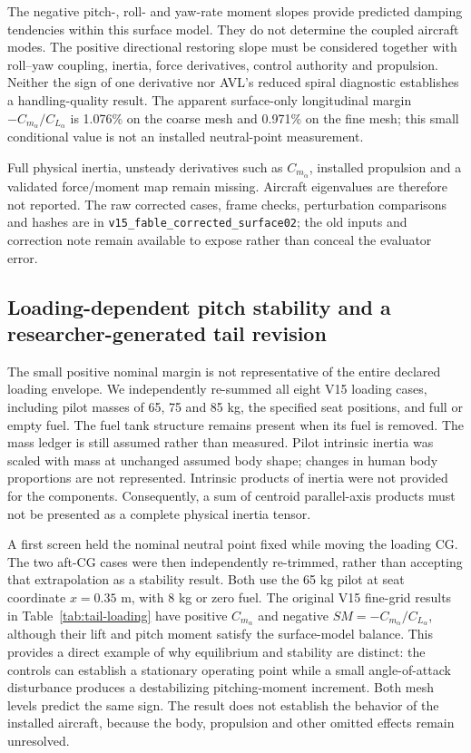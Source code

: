 \documentclass[11pt,a4paper]{article}
\begin{document}
The negative pitch-, roll- and yaw-rate moment slopes provide predicted
damping tendencies within this surface model. They do not determine the
coupled aircraft modes. The positive directional restoring slope must be
considered together with roll--yaw coupling, inertia, force derivatives,
control authority and propulsion. Neither the sign of one derivative nor
AVL's reduced spiral diagnostic establishes a handling-quality result.
The apparent surface-only longitudinal margin $-C_{m_\alpha}/C_{L_\alpha}$ is 1.076\% on the coarse mesh and 0.971\% on the fine mesh; this small conditional value is not an installed neutral-point measurement.

Full physical inertia, unsteady derivatives such as
$C_{m_{\dot\alpha}}$, installed propulsion and a validated force/moment map
remain missing. Aircraft eigenvalues are therefore not reported. The raw
corrected cases, frame checks, perturbation comparisons and hashes are in
\texttt{v15\_fable\_corrected\_surface02}; the old inputs and correction note
remain available to expose rather than conceal the evaluator error.


\subsection{Loading-dependent pitch stability and a researcher-generated tail revision}
\label{sec:tail-loading-revision}

The small positive nominal margin is not representative of the entire declared
loading envelope. We independently re-summed all eight V15 loading cases,
including pilot masses of 65, 75 and 85 kg, the specified seat positions, and
full or empty fuel. The fuel tank structure remains present when its fuel is
removed. The mass ledger is still assumed rather than measured. Pilot intrinsic
inertia was scaled with mass at unchanged assumed body shape; changes in human
body proportions are not represented. Intrinsic products of inertia were not
provided for the components. Consequently, a sum of centroid parallel-axis
products must not be presented as a complete physical inertia tensor.

A first screen held the nominal neutral point fixed while moving the loading
CG. The two aft-CG cases were then independently re-trimmed, rather than accepting
that extrapolation as a stability result. Both use the 65 kg pilot at seat
coordinate $x=0.35$ m, with 8 kg or zero fuel. The original V15 fine-grid results
in Table~\ref{tab:tail-loading} have positive $C_{m_\alpha}$ and negative
$SM=-C_{m_\alpha}/C_{L_\alpha}$, although their lift and pitch moment satisfy
the surface-model balance. This provides a direct example of why equilibrium
and stability are distinct: the controls can establish a stationary operating
point while a small angle-of-attack disturbance produces a destabilizing
pitching-moment increment. Both mesh levels predict the same sign. The result
does not establish the behavior of the installed aircraft, because the body,
propulsion and other omitted effects remain unresolved.
\end{document}
